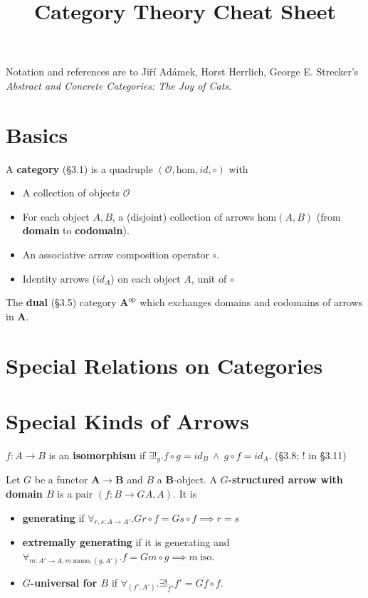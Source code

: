 \documentclass[10pt,twocolumn,letterpaper]{article}
\title{Category Theory Cheat Sheet}
\newcommand{\defn}[1]{{\bf #1}}
\begin{document}
Notation and references are to Ji\v{r}\'i Ad\'amek, Horst Herrlich, George
E. Strecker's {\em Abstract and Concrete Categories: The Joy of Cats}.

\section{Basics}

  A \defn{category} (\S3.1) is a quadruple
  $(\mathcal{O},\mbox{hom},id,\circ)$ with
  \begin{itemize}
    \item A collection of objects $\mathcal{O}$
  \item For each object $A,B$, a (disjoint) collection of arrows
    $\mbox{hom}(A,B)$ (from \defn{domain} to \defn{codomain}).
    \item An associative arrow composition operator $\circ$.
    \item Identity arrows ($id_A$) on each object $A$, unit of $\circ$
  \end{itemize}

  The \defn{dual} (\S3.5) category $\mathbf{A}^\text{op}$ which
    exchanges domains and codomains of arrows in $\mathbf{A}$.

\section{Special Relations on Categories}

\section{Special Kinds of Arrows}

  $f : A \to B$ is an \defn{isomorphism} if $\exists!_g . f \circ g = id_B
    ~\wedge~ g \circ f = id_A$. (\S3.8; ! in \S3.11)

  Let $G$ be a functor $\mathbf{A} \to \mathbf{B}$ and $B$ a
  $\mathbf{B}$-object. A \defn{$G$-structured arrow with domain $B$}
  is a pair $(f : B \to GA, A)$.  It is
  \begin{itemize}
    \item \defn{generating} if $\forall_{r,s : A \to A'} . Gr \circ f = Gs
      \circ f \implies r = s$
    \item \defn{extremally generating} if it is generating and $\forall_{m :
      A' \to A, m ~\text{mono}, (g,A')} . f = Gm \circ g \implies m ~\text{iso}$.
    \item \defn{$G$-universal for $B$} if $\forall_{(f', A')} .
    \exists!_{\check f} . f' = G{\check f} \circ f$.
  \end{itemize}
\end{document}
